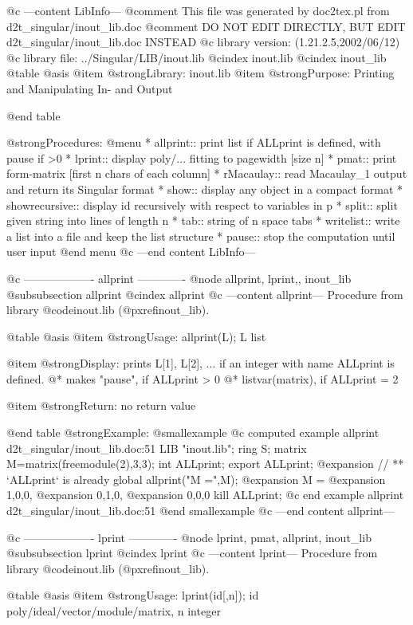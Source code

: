@c ---content LibInfo---
@comment This file was generated by doc2tex.pl from d2t_singular/inout_lib.doc
@comment DO NOT EDIT DIRECTLY, BUT EDIT d2t_singular/inout_lib.doc INSTEAD
@c library version: (1.21.2.5,2002/06/12)
@c library file: ../Singular/LIB/inout.lib
@cindex inout.lib
@cindex inout_lib
@table @asis
@item @strong{Library:}
inout.lib
@item @strong{Purpose:}
     Printing and Manipulating In- and Output

@end table

@strong{Procedures:}
@menu
* allprint:: print list if ALLprint is defined, with pause if >0
* lprint:: display poly/... fitting to pagewidth [size n]
* pmat:: print form-matrix [first n chars of each column]
* rMacaulay:: read Macaulay_1 output and return its Singular format
* show:: display any object in a compact format
* showrecursive:: display id recursively with respect to variables in p
* split:: split given string into lines of length n
* tab:: string of n space tabs
* writelist:: write a list into a file and keep the list structure
* pause:: stop the computation until user input
@end menu
@c ---end content LibInfo---

@c ------------------- allprint -------------
@node allprint, lprint,, inout_lib
@subsubsection allprint
@cindex allprint
@c ---content allprint---
Procedure from library @code{inout.lib} (@pxref{inout_lib}).

@table @asis
@item @strong{Usage:}
allprint(L); L list

@item @strong{Display:}
prints L[1], L[2], ... if an integer with name ALLprint is defined.
@* makes "pause", if ALLprint > 0
@* listvar(matrix), if ALLprint = 2

@item @strong{Return:}
no return value

@end table
@strong{Example:}
@smallexample
@c computed example allprint d2t_singular/inout_lib.doc:51 
LIB "inout.lib";
ring S;
matrix M=matrix(freemodule(2),3,3);
int ALLprint; export ALLprint;
@expansion{} // ** `ALLprint` is already global
allprint("M =",M);
@expansion{} M =
@expansion{} 1,0,0,
@expansion{} 0,1,0,
@expansion{} 0,0,0 
kill ALLprint;
@c end example allprint d2t_singular/inout_lib.doc:51
@end smallexample
@c ---end content allprint---

@c ------------------- lprint -------------
@node lprint, pmat, allprint, inout_lib
@subsubsection lprint
@cindex lprint
@c ---content lprint---
Procedure from library @code{inout.lib} (@pxref{inout_lib}).

@table @asis
@item @strong{Usage:}
lprint(id[,n]); id poly/ideal/vector/module/matrix, n integer

